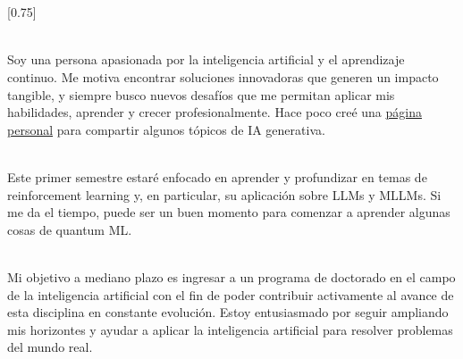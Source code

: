 \documentclass[lighthipster]{cvtheme}
\begin{document}
\thispagestyle{empty}
\section*{}


\subsection*{}
\vspace{4em}

\setlength{\columnsep}{1.5cm}
[0.75]

\begin{paracol}{2}

\paracolbackgroundoptions
\footnotesize
{\setasidefontcolour
\flushright
\vspace{1cm}
\begin{center}
\end{center}

\vspace{0.8cm}
\\[0.5em]
Soy una persona apasionada por la inteligencia artificial y el aprendizaje continuo. Me motiva encontrar soluciones innovadoras que generen un impacto tangible, y siempre busco nuevos desafíos que me permitan aplicar mis habilidades, aprender y crecer profesionalmente. Hace poco creé una \href{https://fernandofetis.notion.site}{página personal} para compartir algunos tópicos de IA generativa.

\vspace{0.8cm}
\\[0.5em]
Este primer semestre estaré enfocado en aprender y profundizar en temas de reinforcement learning y, en particular, su aplicación sobre LLMs y MLLMs. Si me da el tiempo, puede ser un buen momento para comenzar a aprender algunas cosas de quantum ML.

\vspace{0.8cm}
 \\[0.5em]
Mi objetivo a mediano plazo es ingresar a un programa de doctorado en el campo de la inteligencia artificial con el fin de poder contribuir activamente al avance de esta disciplina en constante evolución. Estoy entusiasmado por seguir ampliando mis horizontes y ayudar a aplicar la inteligencia artificial para resolver problemas del mundo real.

}
\end{paracol}
\end{document}
